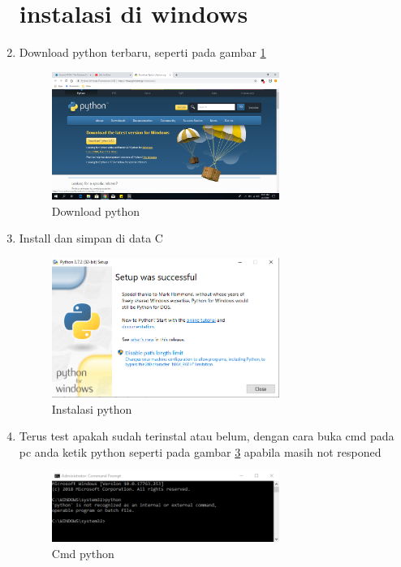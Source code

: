 \begin{enumerate}
	
\section{instalasi di windows}
	
\item   Download python terbaru, seperti pada gambar \ref{Download}
\begin{figure}[ht]
	\centerline{\includegraphics[width=0.70\textwidth]{figures/download_python.PNG}}
	\caption{Download python}
	\label{Download}
\end{figure}
	
\item	Install dan simpan di data C
\begin{figure}[ht]
	\centerline{\includegraphics[width=0.70\textwidth]{figures/instalasi_python.PNG}}
	\caption{Instalasi python}
	\label{instalasi}
\end{figure}
	
\item	Terus test apakah sudah terinstal atau belum, dengan cara buka cmd pada pc anda ketik python seperti pada gambar \ref{cmd_python} apabila masih not responed
\begin{figure}[ht]
	\centerline{\includegraphics[width=0.70\textwidth]{figures/cmd_python.PNG}}
	\caption{Cmd python}
	\label{cmd_python}
\end{figure}
	

\end{enumerate}
